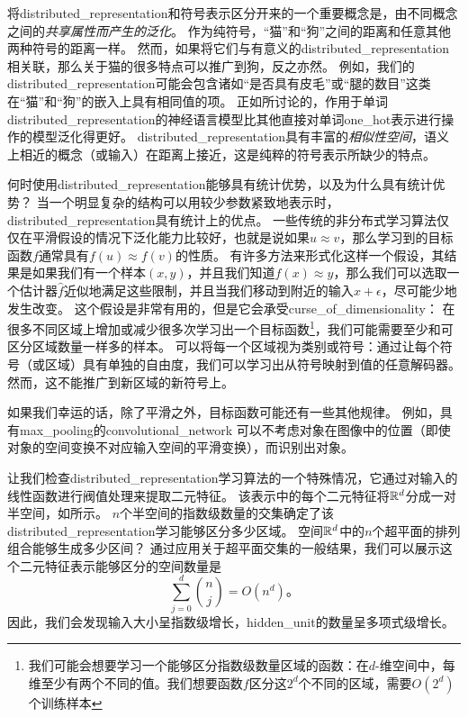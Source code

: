 将\gls{distributed_representation}和符号表示区分开来的一个重要概念是，由不同概念之间的\emph{共享属性而产生的泛化}。
作为纯符号，``猫''和``狗''之间的距离和任意其他两种符号的距离一样。
然而，如果将它们与有意义的\gls{distributed_representation}相关联，那么关于猫的很多特点可以推广到狗，反之亦然。
例如，我们的\gls{distributed_representation}可能会包含诸如``是否具有皮毛''或``腿的数目''这类在``猫''和``狗''的嵌入上具有相同值的项。
正如所讨论的，作用于单词\gls{distributed_representation}的神经语言模型比其他直接对单词\gls{one_hot}表示进行操作的模型泛化得更好。
\gls{distributed_representation}具有丰富的\emph{相似性空间}，语义上相近的概念（或输入）在距离上接近，这是纯粹的符号表示所缺少的特点。


何时使用\gls{distributed_representation}能够具有统计优势，以及为什么具有统计优势？
当一个明显复杂的结构可以用较少参数紧致地表示时，\gls{distributed_representation}具有统计上的优点。
一些传统的非分布式学习算法仅仅在平滑假设的情况下泛化能力比较好，也就是说如果$u\approx v$，那么学习到的目标函数$f$通常具有$f(u) \approx f(v)$的性质。
有许多方法来形式化这样一个假设，其结果是如果我们有一个样本$(x,y)$，并且我们知道$f(x) \approx y$，那么我们可以选取一个估计器$\hat{f}$近似地满足这些限制，并且当我们移动到附近的输入$x + \epsilon$，尽可能少地发生改变。
这个假设是非常有用的，但是它会承受\gls{curse_of_dimensionality}：
在很多不同区域上增加或减少很多次学习出一个目标函数\footnote{我们可能会想要学习一个能够区分指数级数量区域的函数：在$d$-维空间中，每维至少有两个不同的值。我们想要函数$f$区分这$2^d$个不同的区域，需要$O(2^d)$个训练样本}，我们可能需要至少和可区分区域数量一样多的样本。
可以将每一个区域视为类别或符号：通过让每个符号（或区域）具有单独的自由度，我们可以学习出从符号映射到值的任意解码器。
然而，这不能推广到新区域的新符号上。


如果我们幸运的话，除了平滑之外，目标函数可能还有一些其他规律。
例如，具有\gls{max_pooling}的\gls{convolutional_network}
可以不考虑对象在图像中的位置（即使对象的空间变换不对应输入空间的平滑变换），而识别出对象。


让我们检查\gls{distributed_representation}学习算法的一个特殊情况，它通过对输入的线性函数进行阀值处理来提取二元特征。
该表示中的每个二元特征将$\mathbb{R}^d$分成一对半空间，如所示。
$n$个半空间的指数级数量的交集确定了该\gls{distributed_representation}学习能够区分多少区域。
空间$\mathbb{R}^d$中的$n$个超平面的排列组合能够生成多少区间？
通过应用关于超平面交集的一般结果\citep{Zaslavsky-1975}，我们可以展示\citep{Pascanu+et+al-ICLR2014b}这个二元特征表示能够区分的空间数量是
\begin{equation}
	\sum_{j=0}^d \binom{n}{j} = O(n^d)。
\end{equation}
因此，我们会发现输入大小呈指数级增长，\gls{hidden_unit}的数量呈多项式级增长。

